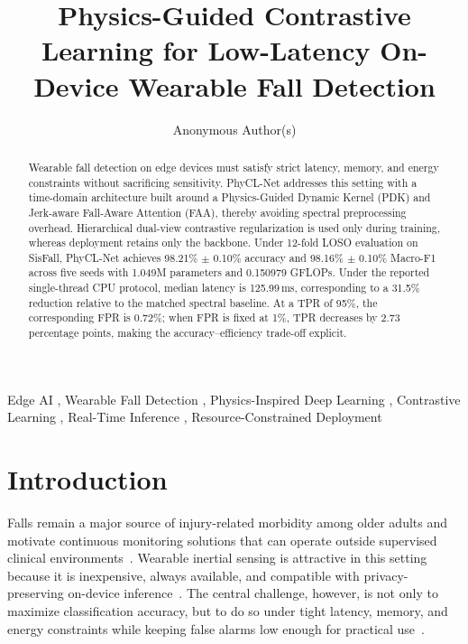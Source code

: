 \documentclass[jec]{acnsart}
\title{Physics-Guided Contrastive Learning for Low-Latency On-Device Wearable Fall Detection}
\author[1]{Anonymous Author(s)}
\begin{document}
\begin{abstract}
Wearable fall detection on edge devices must satisfy strict latency, memory, and energy constraints without sacrificing sensitivity. PhyCL-Net addresses this setting with a time-domain architecture built around a Physics-Guided Dynamic Kernel (PDK) and Jerk-aware Fall-Aware Attention (FAA), thereby avoiding spectral preprocessing overhead. Hierarchical dual-view contrastive regularization is used only during training, whereas deployment retains only the backbone. Under 12-fold LOSO evaluation on SisFall, PhyCL-Net achieves 98.21\% $\pm$ 0.10\% accuracy and 98.16\% $\pm$ 0.10\% Macro-F1 across five seeds with 1.049M parameters and 0.150979 GFLOPs. Under the reported single-thread CPU protocol, median latency is 125.99\,ms, corresponding to a 31.5\% reduction relative to the matched spectral baseline. At a TPR of 95\%, the corresponding FPR is 0.72\%; when FPR is fixed at 1\%, TPR decreases by 2.73 percentage points, making the accuracy--efficiency trade-off explicit.
\end{abstract}

\begin{keywords}
  Edge AI \sep
  Wearable Fall Detection \sep
  Physics-Inspired Deep Learning \sep
  Contrastive Learning \sep
  Real-Time Inference \sep
  Resource-Constrained Deployment
\end{keywords}

\maketitle

\section{Introduction}

Falls remain a major source of injury-related morbidity among older adults and motivate continuous monitoring solutions that can operate outside supervised clinical environments~\cite{Bergen2016Falls}. Wearable inertial sensing is attractive in this setting because it is inexpensive, always available, and compatible with privacy-preserving on-device inference~\cite{Wu2015Wearable}. The central challenge, however, is not only to maximize classification accuracy, but to do so under tight latency, memory, and energy constraints while keeping false alarms low enough for practical use~\cite{Ramachandran2020Survey,mubashir2013survey,Cvach2012AlarmFatigue}.
\end{document}
